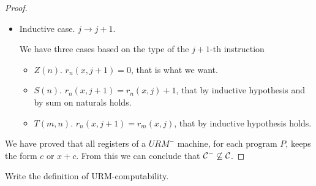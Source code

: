 \documentclass[12pt,a4paper,oneside]{book}
\begin{document}
\begin{exercise}
\begin{proof}
\begin{itemize}
            \item Inductive case. $j \to j + 1$.

            We have three cases based on the type of the $j+1$-th instruction
            \begin{itemize}
                \item $Z(n)$. $r_n(x, j+1) = 0$, that is what we want.
                \item $S(n)$. $r_n(x, j+1) = r_n(x, j) + 1$, that by inductive hypothesis and by sum on naturals holds.
                \item $T(m, n)$. $r_n(x, j + 1) = r_m(x, j)$, that by inductive hypothesis holds.
            \end{itemize}
        \end{itemize}

        We have proved that all registers of a $URM^-$ machine, for each program $P$, keeps the form $c$ or $x + c$. From this we can conclude that $\mathcal{C}^- \not\subseteq \mathcal{C}$.
    \end{proof}

\end{exercise}

\begin{exercise}
    Write the definition of URM-computability.
\end{exercise}
\end{document}
